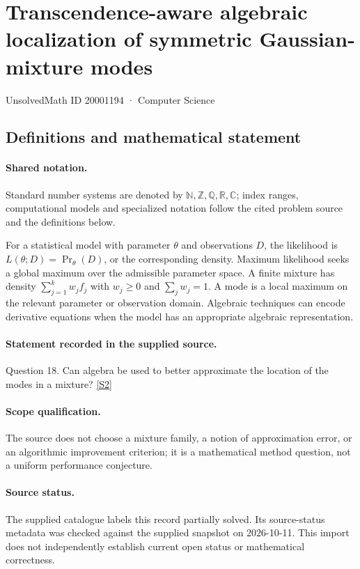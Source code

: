 \documentclass[11pt]{article}
\newcommand{\sref}[2]{\hyperlink{source:#1:#2}{[S#2]}}
\begin{document}
\setcounter{section}{20001193}
\section{Transcendence-aware algebraic localization of symmetric Gaussian-mixture modes}\label{20001194}
{\small\sffamily UnsolvedMath ID 20001194 · Computer Science}
\subsection{Definitions and mathematical statement}

\paragraph{Shared notation.}Standard number systems are denoted by $\mathbb N,\mathbb Z,\mathbb Q,\mathbb R,\mathbb C$; index ranges, computational models and specialized notation follow the cited problem source and the definitions below.


For a statistical model with parameter $\theta$ and observations $D$, the likelihood is $L(\theta;D)=\Pr_\theta(D)$, or the corresponding density. Maximum likelihood seeks a global maximum over the admissible parameter space. A finite mixture has density $\sum_{j=1}^k w_j f_j$ with $w_j\ge0$ and $\sum_j w_j=1$. A mode is a local maximum on the relevant parameter or observation domain. Algebraic techniques can encode derivative equations when the model has an appropriate algebraic representation.
\paragraph{Statement recorded in the supplied source.}
Question 18. Can algebra be used to better approximate the location of the modes in a mixture? \sref{20001194}{2}
\paragraph{Scope qualification.}
The source does not choose a mixture family, a notion of approximation error, or an algorithmic improvement criterion; it is a mathematical method question, not a uniform performance conjecture.
\paragraph{Source status.}
The supplied catalogue labels this record partially solved. Its source-status metadata was checked against the supplied snapshot on 2026-10-11. This import does not independently establish current open status or mathematical correctness.
\end{document}
